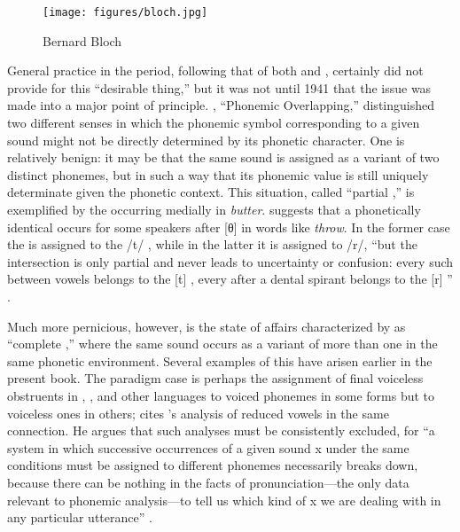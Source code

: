 \begin{wrapfigure}[13]{r}{.3\textwidth}
  \texttt{[image: figures/bloch.jpg]}
  \caption{Bernard Bloch}
  \label{fig:ch.structuralists.bloch}
\end{wrapfigure}
General practice in the period, following that of both {\Sapir} and
{\Bloomfield}, certainly did not provide for this ``desirable thing,''
but it was not until 1941 that the issue was made into a major point
of principle. \citet{bloch41:overlapping}, ``Phonemic Overlapping,''
distinguished two different senses in which the phonemic symbol
corresponding to a given sound might not be directly determined by its
phonetic character. One is relatively benign: it may be that the same
sound is assigned as a variant of two distinct phonemes, but in such a
way that its phonemic value is still uniquely determinate given the
phonetic context. This situation, called ``partial ,'' is
exemplified by the  occurring medially in 
\emph{butter}. {\Bloch} suggests that a phonetically identical 
occurs for some speakers after [θ] in words like \emph{throw}. In the
former case the  is assigned to the /t/ , while in the
latter it is assigned to /r/, ``but the intersection is only partial
and never leads to uncertainty or confusion: every such  between
vowels belongs to the [t] , every  after a dental spirant
belongs to the [r] '' \citep[279f.]{bloch41:overlapping}.

Much more pernicious, however, is the state of affairs characterized
by {\Bloch} as ``complete ,'' where the same sound occurs as a
variant of more than one  in the same phonetic
environment. Several examples of this have arisen earlier in the
present book. The paradigm case is perhaps the assignment of final
voiceless obstruents in , , and other languages to voiced
phonemes in some forms but to voiceless ones in others; {\Bloch} cites
{\Bloomfield}'s analysis of reduced vowels in the same connection. He
argues that such analyses must be consistently excluded, for ``a
system in which successive occurrences of a given sound x under the
same conditions must be assigned to different phonemes necessarily
breaks down, because there can be nothing in the facts of
pronunciation—the only data relevant to phonemic analysis—to tell us
which kind of x we are dealing with in any particular utterance''
\citep[283]{bloch41:overlapping}.

